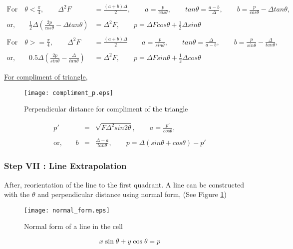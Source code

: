   \begin{equation*}
  \begin{aligned}  
     \text{For} \quad \theta  < \frac{\pi}{4}, 
    \qquad  \Delta^2 F &=\frac{(a+b)\Delta}{2},
    \qquad a=\frac{p}{cos\theta},
      \qquad tan\theta=\frac{a-b}{\Delta},
      \qquad b=\frac{p}{cos\theta}-\Delta tan\theta, \\
      \\
      \text{or,}\qquad \frac{1}{2}\Delta\left(\frac{2p}{cos\theta}-\Delta tan\theta\right)&=\Delta^2 F,
      \qquad \boxed{p=\Delta Fcos\theta+\frac{1}{2}\Delta sin\theta} \\
      \\
\text{For} \quad \theta  >= \frac{\pi}{4},
\qquad
\Delta^2 F &=\frac{(a+b)\Delta}{2}
\qquad
a=\frac{p}{sin\theta},
\qquad
tan\theta=\frac{\Delta}{a-b},
\qquad
b=\frac{p}{sin\theta}-\frac{\Delta}{tan\theta},\\
\\
\text{or,}\qquad 0.5\Delta\left(\frac{2p}{sin\theta}-\frac{\Delta}{tan\theta}\right)&=\Delta^2 F,
\qquad
\boxed{p=\Delta Fsin\theta+\frac{1}{2}\Delta cos\theta}
\end{aligned}
  \end{equation*}
  
\underline{For compliment of triangle},
\begin{figure}[H]
\centering
 \texttt{[image: compliment\_p.eps]}
 \caption{Perpendicular distance for compliment of the triangle}
\end{figure}

\begin{equation*}
\begin{align}
 p'&=&\sqrt{F\Delta^2sin2\theta},
\qquad a=\frac{p'}{cos\theta},\\
\\
\text{or,}\qquad b&=&\frac{\Delta-a}{tan\theta},
\qquad \boxed{p=\Delta(sin\theta+cos\theta)-p'}
\end{align}
\end{equation*}

\subsubsection{Step VII : Line Extrapolation}
After, reorientation of the line to the first quadrant. A line can be constructed with the $\theta$ and perpendicular distance using normal form, (See Figure \ref{Fig:normal})
\begin{figure}
 \centering
 \texttt{[image: normal\_form.eps]}
 \caption{Normal form of a line in the cell}
 \label{Fig:normal}
\end{figure}
\begin{equation}
 x\sin\theta+y\cos\theta = p
\end{equation}

